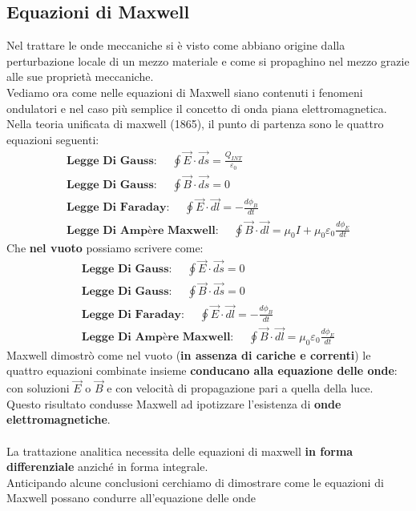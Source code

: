 \documentclass[../main.tex]{subfiles}
\begin{document}
	\subsection{Equazioni di Maxwell}
	Nel trattare le onde meccaniche si è visto come abbiano origine dalla perturbazione locale di un mezzo materiale e come si propaghino nel mezzo grazie alle sue proprietà meccaniche.\\
	Vediamo ora come nelle equazioni di Maxwell siano contenuti i fenomeni ondulatori e nel caso più semplice il concetto di onda piana elettromagnetica.\\
	Nella teoria unificata di maxwell (1865), il punto di partenza sono le quattro equazioni seguenti:
	$$
	\begin{gathered}
		\textbf{Legge Di Gauss: } \quad \oint \vec{E} \cdot \vec{ds} = \frac{Q_{INT}}{\varepsilon_0} \\
		\textbf{Legge Di Gauss: } \quad \oint \vec{B} \cdot \vec{ds} = 0 \\
		\textbf{Legge Di Faraday: } \quad \oint \vec{E} \cdot \vec{dl} = - \frac{d\phi_B}{dt} \\
		\textbf{Legge Di Ampère Maxwell: } \quad \oint \vec{B} \cdot \vec{dl} = \mu_0 I + \mu_0 \varepsilon_0 \frac{d\phi_E}{dt} 
	\end{gathered}
	$$
	Che \textbf{nel vuoto} possiamo scrivere come:
	$$
	\boxed{
		\begin{gathered}
			\textbf{Legge Di Gauss: } \quad \oint \vec{E} \cdot \vec{ds} = 0 \\
			\textbf{Legge Di Gauss: } \quad \oint \vec{B} \cdot \vec{ds} = 0 \\
			\textbf{Legge Di Faraday: } \quad \oint \vec{E} \cdot \vec{dl} = - \frac{d\phi_B}{dt} \\
			\textbf{Legge Di Ampère Maxwell: } \quad \oint \vec{B} \cdot \vec{dl} = \mu_0 \varepsilon_0 \frac{d\phi_E}{dt}
		\end{gathered}
	}
	$$
	Maxwell dimostrò come nel vuoto (\textbf{in assenza di cariche e correnti}) le quattro equazioni combinate insieme \textbf{conducano alla equazione delle onde}: con soluzioni $\vec{E}$ o $\vec{B}$ e con velocità di propagazione pari a quella della luce.\\
	Questo risultato condusse Maxwell ad ipotizzare l’esistenza di \textbf{onde elettromagnetiche}.\\\\
	La trattazione analitica necessita delle equazioni di maxwell \textbf{in forma differenziale} anziché in forma integrale.\\
	Anticipando alcune conclusioni cerchiamo di dimostrare come le equazioni di Maxwell possano condurre all’equazione delle onde
\end{document}
